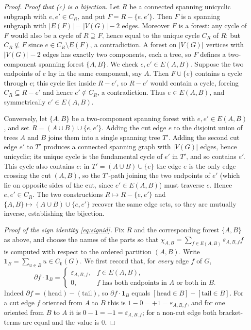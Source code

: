 \begin{proof}
\emph{Proof that {\rm (c)} is a bijection.}
Let $R$ be a connected spanning unicyclic subgraph with $e,e'\in C_R$, and put
$F=R-\{e,e'\}$.  Then $F$ is a spanning subgraph with $|E(F)|=|V(G)|-2$ edges.  Moreover
$F$ is a forest: any cycle of $F$ would also be a cycle of $R\supseteq F$, hence equal to the
unique cycle $C_R$ of $R$; but $C_R\not\subseteq F$ since $e\in C_R\setminus E(F)$, a
contradiction.  A forest on $|V(G)|$ vertices with $|V(G)|-2$ edges has exactly two
components, each a tree, so $F$ defines a two-component spanning forest $\{A,B\}$.  We check
$e,e'\in E(A,B)$.  Suppose the two endpoints of $e$ lay in the same component, say $A$.  Then
$F\cup\{e\}$ contains a cycle through $e$; this cycle lies inside $R-e'$, so $R-e'$ would
contain a cycle, forcing $C_R\subseteq R-e'$ and hence $e'\notin C_R$, a contradiction.
Thus $e\in E(A,B)$, and symmetrically $e'\in E(A,B)$.

Conversely, let $\{A,B\}$ be a two-component spanning forest with $e,e'\in E(A,B)$, and set
$R=(A\cup B)\cup\{e,e'\}$.  Adding the cut edge $e$ to the disjoint union of trees $A$ and
$B$ joins them into a single spanning tree $T'$.  Adding the second cut edge $e'$ to $T'$
produces a connected spanning graph with $|V(G)|$ edges, hence unicyclic; its unique cycle is
the fundamental cycle of $e'$ in $T'$, and so contains $e'$.  This cycle also contains $e$:
in $T'=(A\cup B)\cup\{e\}$ the edge $e$ is the only edge crossing the cut $(A,B)$, so the
$T'$-path joining the two endpoints of $e'$ (which lie on opposite sides of the cut, since
$e'\in E(A,B)$) must traverse $e$.  Hence $e,e'\in C_R$.  The two constructions
$R\mapsto R-\{e,e'\}$ and $\{A,B\}\mapsto (A\cup B)\cup\{e,e'\}$ recover the same edge sets,
so they are mutually inverse, establishing the bijection.

\emph{Proof of the sign identity \eqref{eq:signid}.}
Fix $R$ and the corresponding forest $\{A,B\}$ as above, and choose the names of the parts so
that $\chi_{A,B}=\sum_{f\in E(A,B)}\varepsilon_{A,B,f}f$ is computed with respect to the
ordered partition $(A,B)$.  Write $\mathbf 1_B=\sum_{u\in B}u\in C_0(G)$.  We first record
that, for \emph{every} edge $f$ of $G$,
\begin{equation}
\label{eq:eps_as_boundary}
\partial f\cdot \mathbf 1_B=
\begin{cases}
\varepsilon_{A,B,f}, & f\in E(A,B),\\[2pt]
0, & f\text{ has both endpoints in }A\text{ or both in }B.
\end{cases}
\end{equation}
Indeed $\partial f=(\text{head})-(\text{tail})$, so $\partial f\cdot\mathbf 1_B$ equals
$[\text{head}\in B]-[\text{tail}\in B]$.  For a cut edge $f$ oriented from $A$ to $B$ this is
$1-0=+1=\varepsilon_{A,B,f}$, and for one oriented from $B$ to $A$ it is
$0-1=-1=\varepsilon_{A,B,f}$; for a non-cut edge both bracket-terms are equal and the value is
$0$.


\end{proof}
